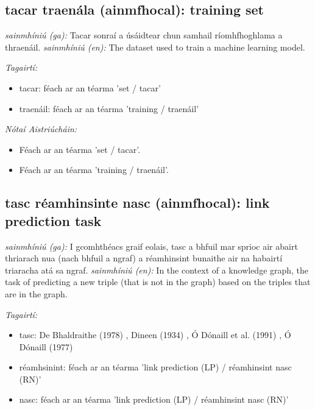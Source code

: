 \documentclass{article}
\begin{document}
\subsection*{tacar traenála (ainmfhocal): training set} 
 \noindent \textit{sainmhíniú (ga):} Tacar sonraí a úsáidtear chun samhail ríomhfhoghlama a thraenáil.
\newline\newline
 \noindent \textit{sainmhíniú (en):} The dataset used to train a machine learning model.
\newline

 \noindent \textit{Tagairtí:}
\begin{itemize}
	\item tacar: féach ar an téarma 'set / tacar'
	\item traenáil: féach ar an téarma 'training / traenáil'
\end{itemize}

 \noindent \textit{Nótaí Aistriúcháin:}
\begin{itemize}
	\item Féach ar an téarma 'set / tacar'.
	\item Féach ar an téarma 'training / traenáil'.
\end{itemize}


\subsection*{tasc réamhinsinte nasc (ainmfhocal): link prediction task} 
 \noindent \textit{sainmhíniú (ga):} I gcomhthéacs graif eolais, tasc a bhfuil mar sprioc air abairt thriarach nua (nach bhfuil a ngraf) a réamhinsint bunaithe air na habairtí triaracha atá sa ngraf.
\newline\newline
 \noindent \textit{sainmhíniú (en):} In the context of a knowledge graph, the task of predicting a new triple (that is not in the graph) based on the triples that are in the graph.
\newline

 \noindent \textit{Tagairtí:}
\begin{itemize}
	\item tasc: De Bhaldraithe (1978) \cite{de-bhaldraithe}, Dineen (1934) \cite{dineen}, Ó Dónaill et al. (1991) \cite{focloir-beag}, Ó Dónaill (1977) \cite{odonaill}
	\item réamhsinint: féach ar an téarma 'link prediction (LP) / réamhinsint nasc (RN)'
	\item nasc: féach ar an téarma 'link prediction (LP) / réamhinsint nasc (RN)'
\end{itemize}
\end{document}
